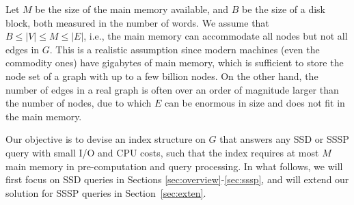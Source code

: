 \documentclass{sig-alternate}
\def\vgap{\vspace{0mm}}
\begin{document}
\begin{sloppy}
\vgap

Let $M$ be the size of the main memory available, and $B$ be the size of a disk block, both measured in the number of words. We assume that $B \le |V| \le M \le |E|$, i.e., the main memory can accommodate all nodes but not all edges in $G$. This is a realistic assumption since modern machines (even the commodity ones) have gigabytes of main memory, which is sufficient to store the node set of a graph with up to a few billion nodes. On the other hand, the number of edges in a real graph is often over an order of magnitude larger than the number of nodes, due to which $E$ can be enormous in size and does not fit in the main memory.

\vgap




Our objective is to devise an index structure on $G$ that answers any SSD or SSSP query with small I/O and CPU costs, such that the index requires at most $M$ main memory in pre-computation and query processing. In what follows, we will first focus on SSD queries in Sections \ref{sec:overview}-\ref{sec:sssp}, and will extend our solution for SSSP queries in Section~\ref{sec:exten}.







\end{sloppy}
\end{document}
